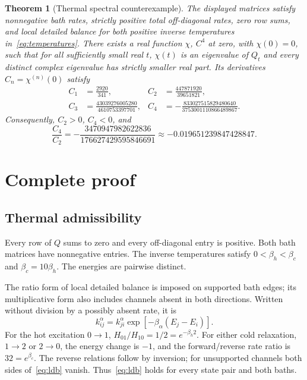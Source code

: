 \documentclass[11pt,a4paper]{article}
\newtheorem{theorem}{Theorem}
\begin{document}
\begin{theorem}[Thermal spectral counterexample]
The displayed matrices satisfy nonnegative bath rates, strictly positive total off-diagonal rates, zero row sums, and local detailed balance for both positive inverse temperatures in~\eqref{eq:temperatures}. There exists a real function $\chi$, $C^4$ at zero, with $\chi(0)=0$, such that for all sufficiently small real $t$, $\chi(t)$ is an eigenvalue of $Q_t$ and every distinct complex eigenvalue has strictly smaller real part. Its derivatives $C_n=\chi^{(n)}(0)$ satisfy
\begin{align}
C_1&=\frac{2920}{341}, &
C_2&=\frac{447871920}{39651821},\label{eq:c12}\\
C_3&=\frac{43039276005280}{4610753397701}, &
C_4&=-\frac{833027515829480640}{3753001110866489867}.
\label{eq:c34}
\end{align}
Consequently, $C_2>0$, $C_4<0$, and
\begin{equation}
\frac{C_4}{C_2}=-\frac{3470947982622836}{176627429595846691}
\approx-0.019651239847428847.
\label{eq:ratio}
\end{equation}
\end{theorem}

\section{Complete proof}
\subsection{Thermal admissibility}
Every row of $Q$ sums to zero and every off-diagonal entry is positive. Both bath matrices have nonnegative entries. The inverse temperatures satisfy $0<\beta_h<\beta_c$ and $\beta_c=10\beta_h$. The energies are pairwise distinct.

The ratio form of local detailed balance is imposed on supported bath edges; its multiplicative form also includes channels absent in both directions. Written without division by a possibly absent rate, it is
\begin{equation}
k^\alpha_{ij}=k^\alpha_{ji}\exp[-\beta_\alpha(E_j-E_i)].
\label{eq:ldb}
\end{equation}
For the hot excitation $0\to1$, $H_{01}/H_{10}=1/2=e^{-\beta_h 2}$. For either cold relaxation, $1\to2$ or $2\to0$, the energy change is $-1$, and the forward/reverse rate ratio is $32=e^{\beta_c}$. The reverse relations follow by inversion; for unsupported channels both sides of~\eqref{eq:ldb} vanish. Thus~\eqref{eq:ldb} holds for every state pair and both baths.
\end{document}
